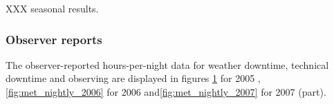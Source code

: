 XXX seasonal results.

\subsubsection{Observer reports}
The observer-reported hours-per-night data for weather downtime, technical downtime and observing are displayed in figures \ref{fig:met_nightly_2005} for 2005 , \ref{fig:met_nightly_2006} for 2006  and\ref{fig:met_nightly_2007} for 2007 (part).

\clearpage
\begin{figure}[h]
\begin{center}
  \label{fig:met_nightly_2005}
\end{center}
\end{figure}
